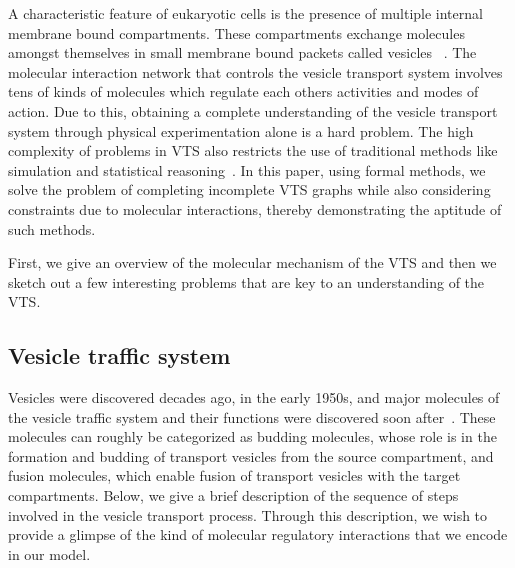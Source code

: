 A characteristic feature of eukaryotic cells is the presence of multiple internal membrane bound compartments. These compartments exchange molecules amongst themselves in small membrane bound packets called vesicles ~\cite{alberts2002molecular}.  The molecular interaction network that controls the vesicle transport system involves tens of kinds of molecules which regulate each others activities and modes of action. Due to this, obtaining a complete understanding of the vesicle transport system through physical experimentation alone is a hard problem.
%
The high complexity of problems in VTS also restricts the use of traditional methods like simulation and statistical reasoning~\cite{mani2016wine, mani2016stacking}. 
In this paper, using formal methods, we solve the problem of completing incomplete VTS graphs while also considering constraints due to molecular interactions, thereby demonstrating the aptitude of such methods.

First, we give an overview of the molecular mechanism of the VTS and then we sketch out a few interesting problems that are key to an understanding of the VTS.

\subsection{Vesicle traffic system}
Vesicles were discovered decades ago, in the early 1950s, and major molecules of the vesicle traffic system and their functions were discovered soon after~\cite{wells2005discovery}. These molecules can roughly be categorized as budding molecules, whose role is in the formation and budding of transport vesicles from the source compartment, and fusion molecules, which enable fusion of transport vesicles with the target compartments. Below, we give a brief description of the sequence of steps involved in the vesicle transport process. Through this description, we wish to provide a glimpse of the kind of molecular regulatory interactions that we encode in our model.

